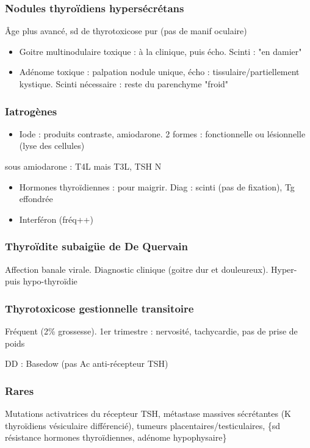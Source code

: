 \documentclass[11pt]{article}
\begin{document}
\subsubsection{Nodules thyroïdiens hypersécrétans}
\label{sec:org645f377}
Âge plus avancé, sd de thyrotoxicose pur (pas de manif oculaire) 
\begin{itemize}
\item Goitre multinodulaire toxique : à la clinique, puis écho. Scinti : "en damier"
\item Adénome toxique : palpation nodule unique, écho : tissulaire/partiellement
kystique. Scinti nécessaire : reste du parenchyme "froid"
\end{itemize}

\subsubsection{Iatrogènes}
\label{sec:org75efe2d}
\begin{itemize}
\item Iode : produits contraste, amiodarone. 2 formes : fonctionnelle ou lésionnelle
(lyse des cellules)
\end{itemize}
\danger sous amiodarone : T4L \inc mais T3L, TSH N 
\begin{itemize}
\item Hormones thyroïdiennes : pour maigrir. Diag : scinti (pas de fixation), Tg
effondrée
\item Interféron (fréq++)
\end{itemize}

\subsubsection{Thyroïdite subaigüe de De Quervain}
\label{sec:org36aa28b}
Affection banale virale. Diagnostic clinique (goitre dur et douleureux). Hyper-
puis hypo-thyroïdie

\subsubsection{Thyrotoxicose gestionnelle transitoire}
\label{sec:org8b70371}
Fréquent (2\% grossesse). 1er trimestre : nervosité, tachycardie, pas de prise de
poids

DD : Basedow (pas Ac anti-récepteur TSH)

\subsubsection{Rares}
\label{sec:orgb20b76a}
Mutations activatrices du récepteur TSH, métastase massives sécrétantes (K
thyroïdiens vésiculaire différencié), tumeurs placentaires/testiculaires, \{sd
résistance hormones thyroïdiennes, adénome hypophysaire\}
\end{document}
